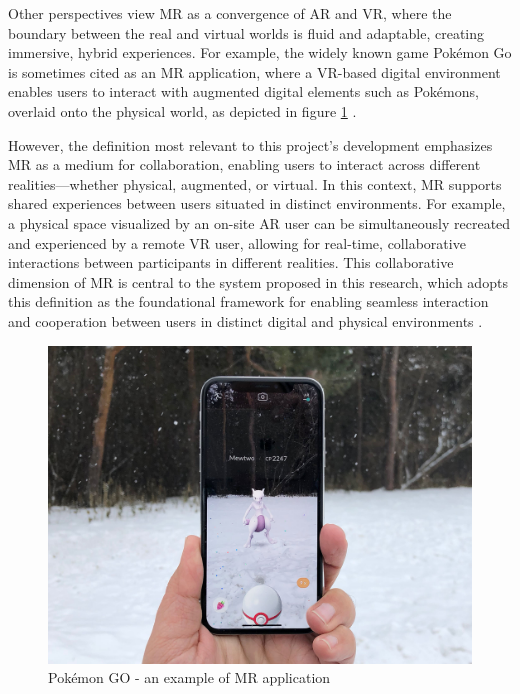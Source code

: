     Other perspectives view \ac{MR} as a convergence of \ac{AR} and \ac{VR}, where the boundary between the real and virtual worlds is fluid and adaptable, creating immersive, hybrid experiences. For example, the widely known game Pokémon Go is sometimes cited as an \ac{MR} application, where a \ac{VR}-based digital environment enables users to interact with augmented digital elements such as Pokémons, overlaid onto the physical world, as depicted in figure \ref{f:pokemon-go} \cite{whatismixedreality}.

    However, the definition most relevant to this project's development emphasizes \ac{MR} as a medium for collaboration, enabling users to interact across different realities—whether physical, augmented, or virtual. In this context, \ac{MR} supports shared experiences between users situated in distinct environments. For example, a physical space visualized by an on-site \ac{AR} user can be simultaneously recreated and experienced by a remote \ac{VR} user, allowing for real-time, collaborative interactions between participants in different realities. This collaborative dimension of \ac{MR} is central to the system proposed in this research, which adopts this definition as the foundational framework for enabling seamless interaction and cooperation between users in distinct digital and physical environments \cite{whatismixedreality}.
   
    \begin{figure}[h]
        \centering
        \includegraphics[width=0.6\linewidth]{figs/mewtwo.jpg}
        \caption{Pokémon GO - an example of \ac{MR} application}
        \label{f:pokemon-go}
    \end{figure}




